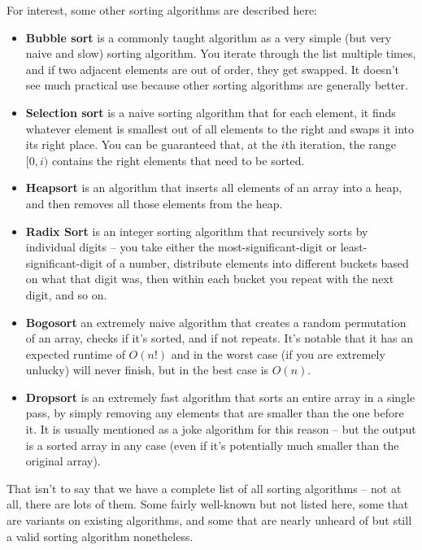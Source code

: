 For interest, some other sorting algorithms are described here:
\begin{itemize}
\item \textbf{Bubble sort}  is a commonly taught algorithm as a very simple (but very naive and slow) sorting algorithm. You iterate through the list multiple times, and if two adjacent elements are out of order, they get swapped. It doesn't see much practical use because other sorting algorithms are generally better.
\item \textbf{Selection sort}  is a naive sorting algorithm that for each element, it finds whatever element is smallest out of all elements to the right and swaps it into its right place. You can be guaranteed that, at the $i$th iteration, the range $[0,i)$ contains the right elements that need to be sorted.
\item \textbf{Heapsort}  is an algorithm that inserts all elements of an array into a heap, and then removes all those elements from the heap.
\item \textbf{Radix Sort}  is an integer sorting algorithm that recursively sorts by individual digits -- you take either the most-significant-digit or least-significant-digit of a number, distribute elements into different buckets based on what that digit was, then within each bucket you repeat with the next digit, and so on.
\item \textbf{Bogosort}  an extremely naive algorithm that creates a random permutation of an array, checks if it's sorted, and if not repeats. It's notable that it has an expected runtime of $O(n!)$ and in the worst case (if you are extremely unlucky) will never finish, but in the best case is $O(n)$.
\item \textbf{Dropsort}  is an extremely fast algorithm that sorts an entire array in a single pass, by simply removing any elements that are smaller than the one before it. It is usually mentioned as a joke algorithm for this reason -- but the output is a sorted array in any case (even if it's potentially much smaller than the original array).
\end{itemize}

That isn't to say that we have a complete list of all sorting algorithms -- not at all, there are lots of them. Some fairly well-known but not listed here, some that are variants on existing algorithms, and some that are nearly unheard of but still a valid sorting algorithm nonetheless.


